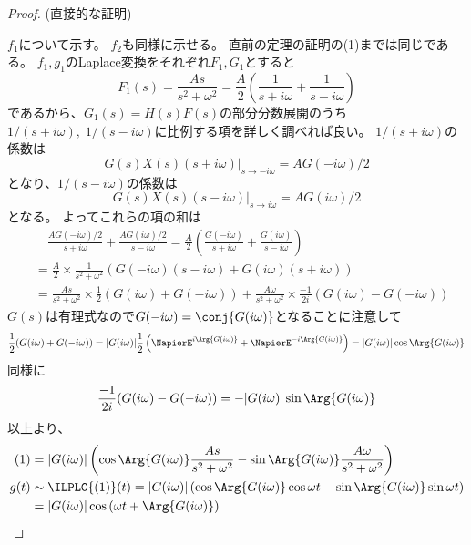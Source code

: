 			\begin{proof}
				(直接的な証明)
				\quad\par
				$f_1$について示す。
				$f_2$も同様に示せる。
				直前の定理の証明の(1)までは同じである。
				$f_1,g_1$のLaplace変換をそれぞれ$F_1,G_1$とすると
				\[ F_1(s) = \frac{As}{s^2+\omega^2} = \frac{A}{2}\left(\frac{1}{s+i\omega} + \frac{1}{s-i\omega}\right) \]
				であるから、$G_1(s) = H(s)F(s)$の部分分数展開のうち$1/(s+i\omega),\;1/(s-i\omega)$に比例する項を詳しく調べれば良い。
				$1/(s+i\omega)$の係数は
				\[ \left. G(s)X(s)(s+i\omega) \right|_{s\to-i\omega} = AG(-i\omega)/2\]
				となり、$1/(s-i\omega)$の係数は
				\[ \left. G(s)X(s)(s-i\omega) \right|_{s\to i\omega} = AG(i\omega)/2\]
				となる。
				よってこれらの項の和は
				\begin{align}
					&\quad \frac{AG(-i\omega)/2}{s+i\omega} + \frac{AG(i\omega)/2}{s-i\omega} = \frac{A}{2}\left(\frac{G(-i\omega)}{s+i\omega} + \frac{G(i\omega)}{s-i\omega}\right) \nonumber\\
					&= \frac{A}{2}\times\frac{1}{s^2+\omega^2}\left(G(-i\omega)(s-i\omega) + G(i\omega)(s+i\omega)\right) \nonumber\\
					&= \frac{As}{s^2+\omega^2}\times\frac{1}{2}(G(i\omega)+G(-i\omega)) + \frac{A\omega}{s^2+\omega^2}\times\frac{-1}{2i}(G(i\omega)-G(-i\omega))
				\end{align}
				$G(s)$は有理式なので$G(-i\omega) = \conj{G(i\omega)}$となることに注意して
				\[ \frac{1}{2}(G(i\omega)+G(-i\omega)) = |G(i\omega)|\frac{1}{2}\left(\NapierE^{i\Arg{G(i\omega)}} + \NapierE^{-i\Arg{G(i\omega)}}\right) = |G(i\omega)|\cos\Arg{G(i\omega)} \]
				同様に
				\[ \frac{-1}{2i}(G(i\omega)-G(-i\omega)) = -|G(i\omega)|\sin\Arg{G(i\omega)} \]
				以上より、
				\begin{align*}
					(1) &= |G(i\omega)|\left(\cos\Arg{G(i\omega)}\frac{As}{s^2+\omega^2} - \sin\Arg{G(i\omega)}\frac{A\omega}{s^2+\omega^2} \right) \\
					g(t) &\sim \ILPLC{(1)}(t) = |G(i\omega)|\left(\cos\Arg{G(i\omega)}\cos\omega t - \sin\Arg{G(i\omega)}\sin\omega t \right) \\
					&= |G(i\omega)|\cos\left(\omega t + \Arg{G(i\omega)}\right)
				\end{align*}
			\end{proof}